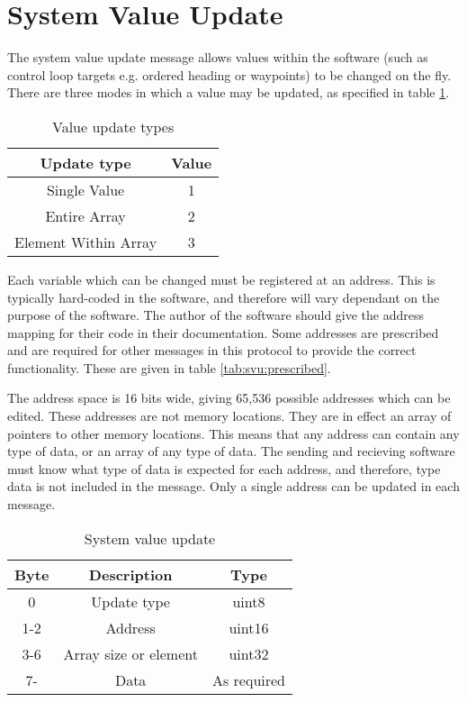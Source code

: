 \section{System Value Update}
\label{msg008}
The system value update message allows values within the software (such as control loop targets e.g. ordered heading or waypoints) to be changed on the fly. There are three modes in which a value may be updated, as specified in table \ref{tab:svu:updTypes}.

\begin{table}[H]
  \centering
  \begin{tabular}{ c c }
    Update type           & Value\\
\hline
    Single Value          & 1 \\
    Entire Array          & 2 \\
    Element Within Array  & 3 \\
  \end{tabular}
  \caption{Value update types}
  \label{tab:svu:updTypes}
\end{table}

Each variable which can be changed must be registered at an address. This is typically hard-coded in the software, and therefore will vary dependant on the purpose of the software. The author of the software should give the address mapping for their code in their documentation. Some addresses are prescribed and are required for other messages in this protocol to provide the correct functionality. These are given in table \ref{tab:svu:prescribed}.

The address space is 16 bits wide, giving 65,536 possible addresses which can be edited. These addresses are not memory locations. They are in effect an array of pointers to other memory locations. This means that any address can contain any type of data, or an array of any type of data. The sending and recieving software must know what type of data is expected for each address, and therefore, type data is not included in the message. Only a single address can be updated in each message.

\begin{table}[H]
  \centering
  \begin{tabular}{ c c c }
  Byte & Description & Type \\
\hline
    0   & Update type & uint8 \\
   1-2  & Address     & uint16 \\
   3-6  & Array size or element & uint32 \\
   7-   & Data & As required \\
  \end{tabular}
  \caption{System value update}
\end{table}

